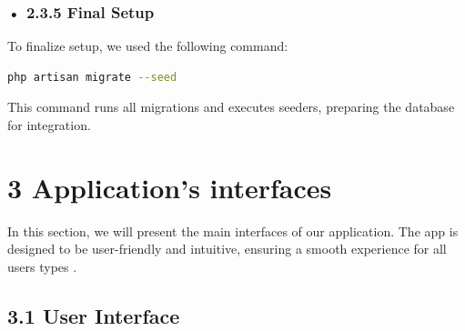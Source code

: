 \documentclass[12pt]{report}
\begin{document}
\subsubsection*{• 2.3.5 Final Setup}
To finalize setup, we used the following command:

\begin{lstlisting}[style=darkbash, language=bash, caption={Laravel command to run migrations and seeders}, belowcaptionskip=10pt]
	php artisan migrate --seed
\end{lstlisting}


\noindent This command runs all migrations and executes seeders, preparing the database for integration.

\section*{3 Application's interfaces}
In this section, we will present the main interfaces of our application. The app is designed to be user-friendly and intuitive, ensuring a smooth experience for all users types .

\subsection*{3.1 User Interface}
\vspace{0.5cm}
\end{document}
